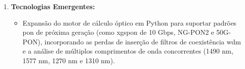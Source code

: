 \begin{enumerate}
    \item \textbf{Tecnologias Emergentes:}
    \begin{itemize}
        \item Expansão do motor de cálculo óptico em Python para suportar padrões \gls{pon} de próxima geração (como \gls{xgspon} de 10 Gbps, NG-PON2 e 50G-PON), incorporando as perdas de inserção de filtros de coexistência \gls{wdm} e a análise de múltiplos comprimentos de onda concorrentes (1490 nm, 1577 nm, 1270 nm e 1310 nm).
    \end{itemize}
\end{enumerate}